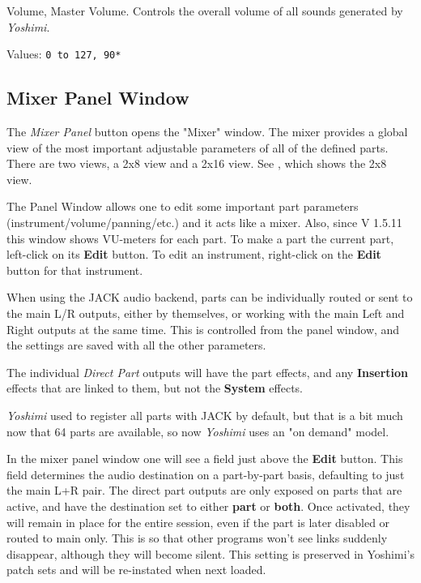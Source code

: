    Volume, Master Volume.
   Controls the overall volume of all sounds generated by
   \textsl{Yoshimi}.

   Values: \texttt{0 to 127, 90*}

\subsection{Mixer Panel Window}
\label{subsec:mixer_panel_window}

   The \textsl{Mixer Panel} button opens the "Mixer" window.
   The mixer provides a global view of the most important
   adjustable parameters of all of the defined parts.
   There are two views, a 2x8 view and a 2x16 view.
   See , which
   shows the 2x8 view.

   The Panel Window allows one to edit some important part parameters
   (instrument/volume/panning/etc.) and it acts like a mixer. Also, since
   V 1.5.11 this window shows VU-meters for each part.
   To make a part the current part, left-click on its \textbf{Edit} button.
   To edit an instrument, right-click on the \textbf{Edit} button for that
   instrument.

   When using the JACK audio backend, parts can be individually routed or sent
   to the main L/R outputs, either by themselves, or working with the main Left
   and Right outputs at the same time.  This is controlled from the panel
   window, and the settings are saved with all the other parameters.

   The individual \textsl{Direct Part} outputs will have the part effects, and any
   \textbf{Insertion} effects that are linked to them, but not the
   \textbf{System} effects.

   \textsl{Yoshimi} used to register all parts with JACK by default, but that
   is a bit much now that 64 parts are available, so now \textsl{Yoshimi}
   uses an "on demand" model.

   In the mixer panel window one will see a field just above the
   \textbf{Edit} button.
   This field determines the audio destination on a part-by-part basis,
   defaulting to just the main L+R pair. The direct part outputs are only
   exposed on parts that are active, and have the destination set to either
   \textbf{part} or \textbf{both}.
   Once activated, they will remain in place for the entire session, even if
   the part is later disabled or routed to main only. This is so that other
   programs won't see links suddenly disappear, although they will become
   silent.  This setting is preserved in Yoshimi's patch sets and will be
   re-instated when next loaded.

